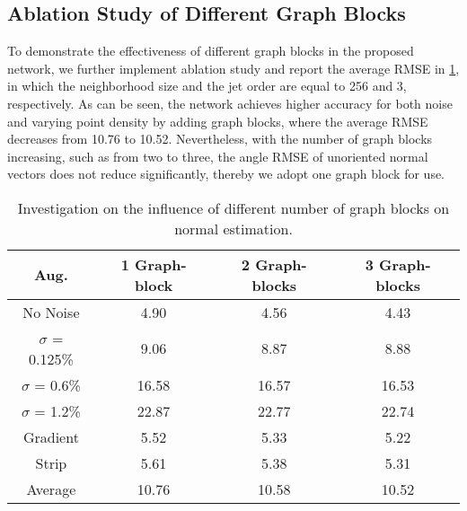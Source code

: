 \documentclass[runningheads]{llncs}
\begin{document}
\subsection{Ablation Study of Different Graph Blocks}
To demonstrate the effectiveness of different graph blocks in the proposed network, we further implement ablation study and report the average RMSE in \cref{tab:graph}, in which the neighborhood size and the jet order are equal to 256 and 3, respectively. As can be seen, the network achieves higher accuracy for both noise and varying point density by adding graph blocks, where the average RMSE decreases from 10.76 to 10.52. Nevertheless, with the number of graph blocks increasing, such as from two to three, the angle RMSE of unoriented normal vectors does not reduce significantly, thereby we adopt one graph block for use.
\begin{table}[t]
\caption{Investigation on the influence of different number of graph blocks on normal estimation.}
\begin{center}
\setlength{\tabcolsep}{1mm}
\begin{tabular}{@{}cccc@{}}
\toprule
Aug.               & 1 Graph-block & 2 Graph-blocks & 3 Graph-blocks \\ \midrule
No Noise           & 4.90          & 4.56          & 4.43          \\
$\sigma$ = 0.125\% & 9.06          & 8.87          & 8.88          \\
$\sigma$ = 0.6\%   & 16.58         & 16.57         & 16.53         \\
$\sigma$ = 1.2\%   & 22.87         & 22.77         & 22.74         \\
Gradient           & 5.52          & 5.33          & 5.22          \\
Strip              & 5.61          & 5.38          & 5.31          \\
Average            & 10.76         & 10.58         & 10.52         \\ \bottomrule
\end{tabular}
\end{center}
\label{tab:graph}
\end{table}
\end{document}
